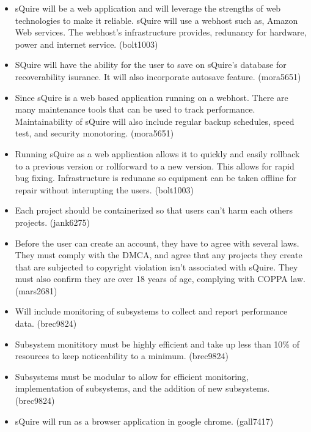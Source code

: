 \documentclass[11pt]{report}
\begin{document}
\begin{itemize}
            \item sQuire will be a web application and will leverage the strengths of web technologies to make it reliable.       sQuire will use a webhost such as, Amazon Web services. The webhost's infrastructure provides, redunancy for hardware, power and internet service. (bolt1003)
            \item SQuire will have the ability for the user to save on sQuire's database for recoverability isurance. It will also incorporate autosave feature. (mora5651)
            \item Since sQuire is a web based application running on a webhost. There are 
            many maintenance tools that can be used to track performance. Maintainability of sQuire will also include regular backup schedules, speed test, and security monotoring. (mora5651)
            \item Running sQuire as a web application allows it to quickly and easily rollback to a previous version or rollforward to a new version. This allows for rapid bug fixing. Infrastructure is redunane so equipment can be taken offline for repair without interupting the users. (bolt1003)
            \item Each project should be containerized so that users can't harm each others projects. (jank6275)
            \item Before the user can create an account, they have to agree with several laws. They must comply with the DMCA, and agree that any projects they create that are subjected to copyright violation isn’t associated with sQuire. They must also confirm they are over 18 years of age, complying with COPPA law. (mars2681)
            \item Will include monitoring of subsystems to collect and report performance data. (brec9824)
            \item Subsystem monititory must be highly efficient and take up less than 10\% of resources to keep noticeability to a minimum. (brec9824)
            \item Subsystems must be modular to allow for efficient monitoring, implementation of subsystems, and the addition of new subsystems. (brec9824)
            \item sQuire will run as a browser application in google chrome. (gall7417)

\end{itemize}
\end{document}

